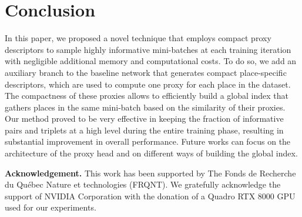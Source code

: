 \documentclass{bmvc2k}
\begin{document}
\section{Conclusion}
\label{conclusion}
In this paper, we proposed a novel technique that employs compact proxy descriptors to sample highly informative mini-batches at each training iteration with negligible additional memory and computational costs. To do so, we add an auxiliary branch to the baseline network that generates compact place-specific descriptors, which are used to compute one proxy for each place in the dataset. The compactness of these proxies allows to efficiently build a global index that gathers places in the same mini-batch based on the similarity of their proxies.
Our method proved to be very effective in keeping the fraction of informative pairs and triplets at a high level during the entire training phase, resulting in substantial improvement in overall performance. Future works can focus on the architecture of the proxy head and on different ways of building the global index.


\vspace{5pt}
\noindent\textbf{Acknowledgement.} This work has been supported by The Fonds de Recherche du Québec Nature et technologies (FRQNT). We gratefully acknowledge the support of NVIDIA Corporation with the donation of a Quadro RTX 8000 GPU used for our experiments.


\end{document}

